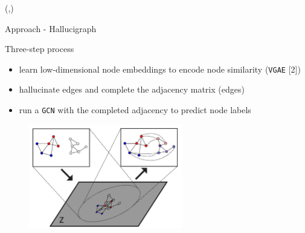 \documentclass[final]{beamer}
\begin{document}
\begin{frame}[fragile]{}
\begin{textblock}{\colwidth}(\secondcolpos,\vstartCols)
\begin{paddedBlock}{Approach - Hallucigraph}

\alert{Three-step process}
  \begin{itemize}
    \item learn low-dimensional node embeddings to encode node similarity (\texttt{VGAE} [2])
    \item hallucinate edges and complete the adjacency matrix (edges) 
    \item run a \texttt{GCN} with the completed adjacency to predict node labels
  \end{itemize}
  \begin{figure}
      \centering
      \includegraphics[width=0.60\textwidth]{img/graph_fig2.pdf}
      \label{fig:coins}
  \end{figure}


\end{paddedBlock}
\end{textblock}
\end{frame}
\end{document}
